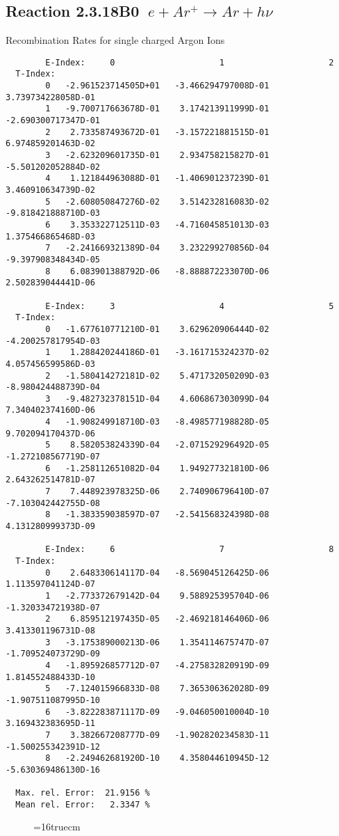 \documentclass[12pt]{article}
\begin{document}
\subsection{
Reaction 2.3.18B0  $ \  e + Ar^+ \rightarrow  Ar + h\nu $
}

  Recombination Rates for single
  charged Argon Ions

\begin{small}\begin{verbatim}
        E-Index:     0                     1                     2
  T-Index:
        0   -2.961523714505D+01   -3.466294797008D-01    3.739734228058D-01
        1   -9.700717663678D-01    3.174213911999D-01   -2.690300717347D-01
        2    2.733587493672D-01   -3.157221881515D-01    6.974859201463D-02
        3   -2.623209601735D-01    2.934758215827D-01   -5.501202052884D-02
        4    1.121844963088D-01   -1.406901237239D-01    3.460910634739D-02
        5   -2.608050847276D-02    3.514232816083D-02   -9.818421888710D-03
        6    3.353322712511D-03   -4.716045851013D-03    1.375466865468D-03
        7   -2.241669321389D-04    3.232299270856D-04   -9.397908348434D-05
        8    6.083901388792D-06   -8.888872233070D-06    2.502839044441D-06

        E-Index:     3                     4                     5
  T-Index:
        0   -1.677610771210D-01    3.629620906444D-02   -4.200257817954D-03
        1    1.288420244186D-01   -3.161715324237D-02    4.057456599586D-03
        2   -1.580414272181D-02    5.471732050209D-03   -8.980424488739D-04
        3   -9.482732378151D-04    4.606867303099D-04    7.340402374160D-06
        4   -1.908249918710D-03   -8.498577198828D-05    9.702094170437D-06
        5    8.582053824339D-04   -2.071529296492D-05   -1.272108567719D-07
        6   -1.258112651082D-04    1.949277321810D-06    2.643262514781D-07
        7    7.448923978325D-06    2.740906796410D-07   -7.103042442755D-08
        8   -1.383359038597D-07   -2.541568324398D-08    4.131280999373D-09

        E-Index:     6                     7                     8
  T-Index:
        0    2.648330614117D-04   -8.569045126425D-06    1.113597041124D-07
        1   -2.773372679142D-04    9.588925395704D-06   -1.320334721938D-07
        2    6.859512197435D-05   -2.469218146406D-06    3.413301196731D-08
        3   -3.175389000213D-06    1.354114675747D-07   -1.709524073729D-09
        4   -1.895926857712D-07   -4.275832820919D-09    1.814552488433D-10
        5   -7.124015966833D-08    7.365306362028D-09   -1.907511087995D-10
        6   -3.822283871117D-09   -9.046050010004D-10    3.169432383695D-11
        7    3.382667208777D-09   -1.902820234583D-11   -1.500255342391D-12
        8   -2.249462681920D-10    4.358044610945D-12   -5.630369486130D-16

  Max. rel. Error:  21.9156 %
  Mean rel. Error:   2.3347 %

\end{verbatim}\end{small}
\begin{figure} \label{2.3.18B0}
\epsfxsize=16truecm
\end{figure}
\newpage
\end{document}
